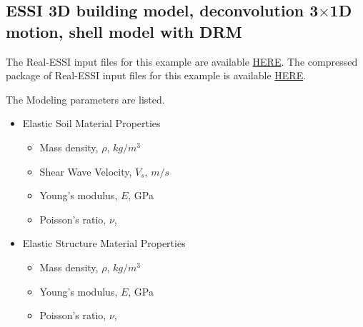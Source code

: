 




\clearpage
\newpage
\subsection{ESSI 3D building model, deconvolution  3$\times$1D motion, shell model with DRM}
\label{Earthquake_Soil-Structure_Interaction_3D_Model_with_DRM4}

The Real-ESSI input files for this example are available 
\href{http://sokocalo.engr.ucdavis.edu/~jeremic/lecture_notes_online_material/_Chapter_Short_Course_Examples/Day2/Deconvolution_3by1D_Motions/Shell_Structure_Soil_Interaction_3D_DRM}{HERE}. 
The compressed package of Real-ESSI input files for this example is available 
\href{http://sokocalo.engr.ucdavis.edu/~jeremic/lecture_notes_online_material/_Chapter_Short_Course_Examples/Day2/Deconvolution_3by1D_Motions/Shell_Structure_Soil_Interaction_3D_DRM/_all_files_packaged_for_Shell_Structure_Soil_Interaction_3D_DRM.tar.gz}{HERE}. 

The Modeling parameters are listed.
\begin{itemize}
  \item Elastic Soil Material Properties 
  \begin{itemize}
    \item Mass density, $\rho$, \enspace {} $kg/m^3$
    \item Shear Wave Velocity, $V_s$, \enspace {} $m/s$
    \item Young's modulus, $E$, \enspace {} GPa
    \item Poisson's ratio, $\nu$, \enspace {}
  \end{itemize}
  \item Elastic Structure Material Properties 
  \begin{itemize}
    \item Mass density, $\rho$, \enspace {} $kg/m^3$
    \item Young's modulus, $E$, \enspace {} GPa
    \item Poisson's ratio, $\nu$, \enspace {}
  \end{itemize}
\end{itemize}

